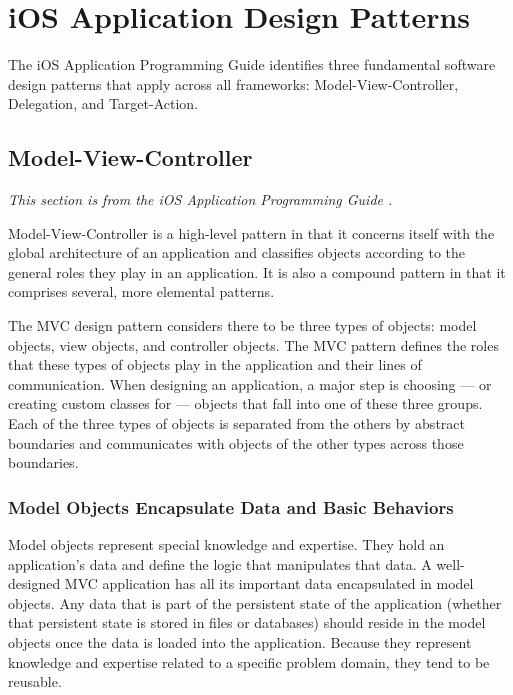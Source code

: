 \section{iOS Application Design Patterns}
\label{sect:cocoa}

The iOS Application Programming Guide identifies three fundamental software
design patterns that apply across all frameworks: Model-View-Controller,
Delegation, and Target-Action.

\subsection{Model-View-Controller}
\label{sect:cocoa_mvc}

\emph{This section is from the iOS Application Programming Guide
\cite[p.~160--165]{ios:cocoa-fundamentals}.}

Model-View-Controller is a high-level pattern in that it concerns itself
with the global architecture of an application and classifies objects
according to the general roles they play in an application. It is also a
compound pattern in that it comprises several, more elemental patterns.

The MVC design pattern considers there to be three types of objects: model
objects, view objects, and controller objects. The MVC pattern defines the
roles that these types of objects play in the application and their lines of
communication. When designing an application, a major step is choosing ---
or creating custom classes for --- objects that fall into one of these three
groups. Each of the three types of objects is separated from the others by
abstract boundaries and communicates with objects of the other types across
those boundaries.

\subsubsection{Model Objects Encapsulate Data and Basic Behaviors}

Model objects represent special knowledge and expertise. They hold an
application’s data and define the logic that manipulates that data. A
well-designed MVC application has all its important data encapsulated in model
objects. Any data that is part of the persistent state of the application
(whether that persistent state is stored in files or databases) should reside in
the model objects once the data is loaded into the application. Because they
represent knowledge and expertise related to a specific problem domain, they
tend to be reusable.

